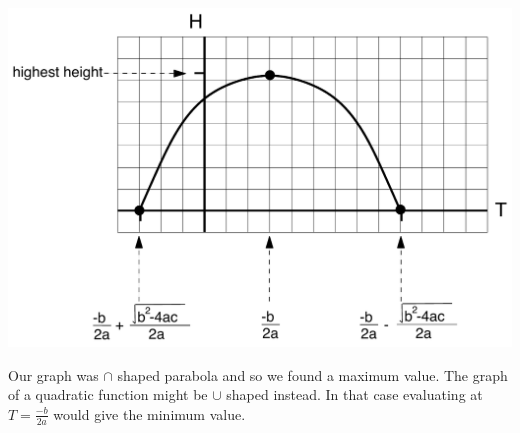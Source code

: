 \begin{center}
 {\includegraphics [width = 6in] {quadratic.pdf}}
\end{center}

Our graph was $\cap$ shaped parabola and so we found a maximum value.  The graph of a quadratic function might be $\cup$ shaped instead.  In that case evaluating at $T=\frac{-b}{2a}$ would give the minimum value. 

%

%